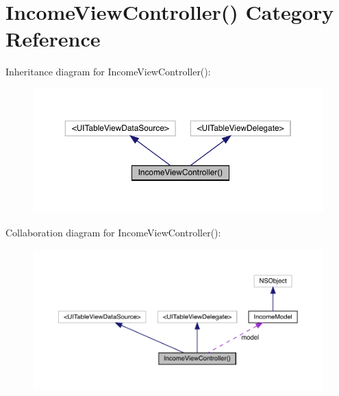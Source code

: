\hypertarget{category_income_view_controller_07_08}{}\section{Income\+View\+Controller() Category Reference}
\label{category_income_view_controller_07_08}


Inheritance diagram for Income\+View\+Controller()\+:\nopagebreak
\begin{figure}[H]
\begin{center}
\leavevmode
\includegraphics[width=350pt]{category_income_view_controller_07_08__inherit__graph}
\end{center}
\end{figure}


Collaboration diagram for Income\+View\+Controller()\+:\nopagebreak
\begin{figure}[H]
\begin{center}
\leavevmode
\includegraphics[width=350pt]{category_income_view_controller_07_08__coll__graph}
\end{center}
\end{figure}
